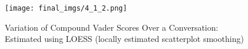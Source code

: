 




\begin{figure}[h]
    \centering
    \texttt{[image: final\_imgs/4\_1\_2.png]}
    \caption{Variation of Compound Vader Scores Over a Conversation: Estimated using LOESS (locally estimated scatterplot smoothing)}
    \label{fig:fig17}
\end{figure}%

